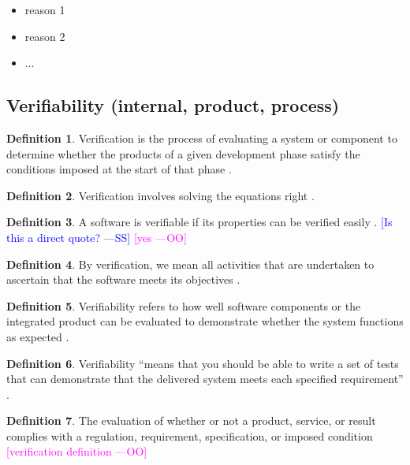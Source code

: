 \documentclass[letterpaper, cleveref]{lipics-v2019}
\newcommand{\authornote}[3]{\textcolor{#1}{[#3 ---#2]}}
\newcommand{\authornote}[3]{}
\newcommand{\wss}[1]{\authornote{blue}{SS}{#1}} %
\newcommand{\oo}[1]{\authornote{magenta}{OO}{#1}} %
\newcommand{\notdone}[1]{\textcolor{red}{#1}}
\theoremstyle{definition}
\newtheorem{defn}{Definition}
\begin{document}
\begin{itemize}
  \item reason 1
  \item reason 2
  \item ...
\end{itemize}


\subsection{Verifiability (internal, product, process) } %

\begin{defn}
	 Verification is the process of evaluating a system or component to
   determine whether the products of a given development phase satisfy the
   conditions imposed at the start of that phase
   \citep{IEEEStdGlossarySET1990}.
\end{defn}

\begin{defn}
	Verification involves solving the equations right \citep[p.~23]{Roache1998}.
\end{defn}

\begin{defn}
  A software is verifiable if its properties can be verified easily
  \citep{GhezziEtAl2003}.  \wss{Is this a direct quote?} \oo{yes}
\end{defn}

\begin{defn}
	By verification, we mean all activities that are undertaken to ascertain
  that the software meets its objectives \citep{GhezziEtAl2003}.
\end{defn}

\begin{defn}
	Verifiability refers to how well software components or the integrated
  product can be evaluated to demonstrate whether the system functions as
  expected \citep{wiegers2003softreq}.
\end{defn}

\begin{defn} \label{Defn_Verifiability1}
  Verifiability ``means that you should be able to write a set of tests that
  can demonstrate that the delivered system meets each specified
  requirement'' \citep{sommerville}. %
\end{defn}

\begin{defn}
	The evaluation of whether or not a product, service, or result complies
  with a regulation, requirement, specification, or imposed condition
  \citep{project2017guide} \oo {verification definition}
\end{defn}
\end{document}
